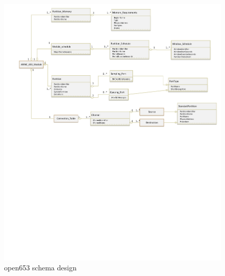 \begin{figure}[H]	\includegraphics[clip=true,trim=0cm 20cm 0cm 0cm,width=\linewidth,keepaspectratio]{figures/open653schema.pdf}
	\caption{open653 schema design}
	\label{fig:open653schema}
\end{figure}

